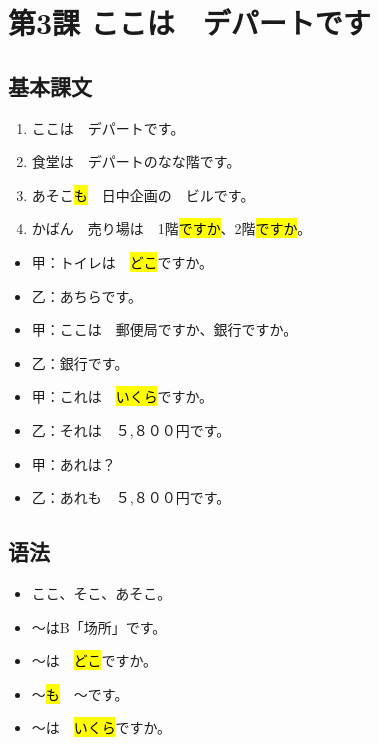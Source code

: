 \section{第3課 ここは　デパートです}

\subsection{基本課文}

\begin{enumerate}
    \item ここは　デパートです。
    \item 食堂は　デパートのなな階です。
    \item あそこ\hl{も}　日中企画の　ビルです。
    \item かばん　売り場は　1階\hl{ですか}、2階\hl{ですか}。
\end{enumerate}

\begin{itemize}
    \item 甲：トイレは　\hl{どこ}ですか。
    \item 乙：あちらです。
\end{itemize}


\begin{itemize}
    \item 甲：ここは　郵便局ですか、銀行ですか。
    \item 乙：銀行です。
\end{itemize}

\begin{itemize}
    \item 甲：これは　\hl{いくら}ですか。
    \item 乙：それは　５,８００円です。
    \item 甲：あれは？
    \item 乙：あれも　５,８００円です。
\end{itemize}


\subsection{语法}

\begin{itemize}
    \item ここ、そこ、あそこ。
    \item 〜はB「场所」です。
    \item 〜は　\hl{どこ}ですか。
    \item 〜\hl{も}　〜です。
    \item 〜は　\hl{いくら}ですか。
\end{itemize}


